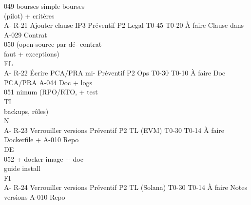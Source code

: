 \documentclass[12pt,landscape,a4paper]{article}
\begin{document}
049         bourses simple                                                          bourses\\
(pilot) + critères\\
A- R-21     Ajouter clause IP3 Préventif P2       Legal       T0-45 T0-20 À faire   Clause dans    A-029    Contrat\\
050         (open-source par dé-                                                    contrat\\
faut + exceptions)\\
\vspace{0.5em}
\vspace{0.5em}
\vspace{0.5em}
\vspace{0.5em}
EL\\
A- R-22     Écrire PCA/PRA mi- Préventif P2       Ops         T0-30 T0-10 À faire   Doc PCA/PRA A-044       Doc + logs\\
051         nimum (RPO/RTO,                                                         + test\\
\vspace{0.5em}
\vspace{0.5em}
\vspace{0.5em}
\vspace{0.5em}
TI\\
backups, rôles)\\
\vspace{0.5em}
\vspace{0.5em}
\vspace{0.5em}
\vspace{0.5em}
N\\
A- R-23     Verrouiller versions Préventif P2     TL (EVM)    T0-30 T0-14 À faire   Dockerfile +   A-010    Repo\\
\vspace{0.5em}
\vspace{0.5em}
\vspace{0.5em}
\vspace{0.5em}
DE\\
052         + docker image +                                                        doc\\
guide install\\
\vspace{0.5em}
\vspace{0.5em}
\vspace{0.5em}
\vspace{0.5em}
FI\\
A- R-24     Verrouiller versions Préventif P2     TL (Solana) T0-30 T0-14 À faire   Notes versions A-010    Repo\\
\end{document}

